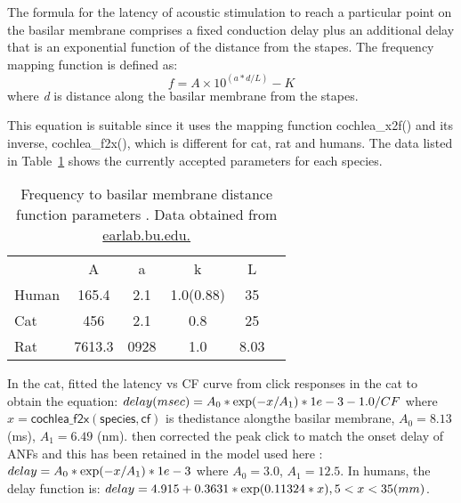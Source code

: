 The formula for the latency of acoustic stimulation to reach a particular point
on the basilar membrane comprises a fixed conduction delay plus an additional
delay that is an exponential function of the distance from the stapes. The
frequency mapping function is defined as:
\[
 f = A\times10^{\left(a*d/L\right)} - K
 \]
where \emph{d} is distance along the basilar membrane from the stapes.

\medskip{}

This equation is suitable since it uses the mapping function
\mbox{\textsf{cochlea\_x2f()}} and its inverse, \mbox{\textsf{cochlea\_f2x()}},
which is different for cat, rat and humans.  The data listed in
Table~\ref{tab:f2x} shows the currently accepted parameters for each species.


\begin{table}[h]
  \centering
  \begin{tabular}{lccccc}
    \hline
& A & a & k & L \\
Human &165.4	&2.1	&1.0(0.88)	&35     \\
Cat&456&	2.1&0.8&25 \\
Rat&7613.3	&0928	&1.0&	8.03     \\
    \hline
  \end{tabular}
  \caption{Frequency to basilar membrane distance function parameters \citep{FitzGeraldBurkittEtAl:2001}. Data obtained from \url{earlab.bu.edu.}}\label{tab:f2x}
\end{table}


In the cat, \citet{CarneyYin:1988} fitted the latency vs CF curve from click
responses in the cat to obtain the equation: \( delay (msec) = A_0 * {\rm exp}(
-x / A_1 ) * 1e-3 - 1.0/CF \) where $x = \mathsf{cochlea\_f2x(species, cf)}$ is
thedistance alongthe basilar membrane, $A_0 = 8.13$ (ms), $A_1 = 6.49$
(nm). \citet{HeinzZhangEtAl:2001} then corrected the peak click to match the
onset delay of ANFs and this has been retained in the model used here
\citep{ZilanyBruceEtAl:2009}: \(delay = A_0 * {\rm exp}(-x / A_1) * 1e-3 \)
where $A_0 = 3.0$, $A_1 = 12.5$. In humans, the delay function is: \( delay =
4.915 + 0.3631 * {\rm exp}(0.11324*x) , 5<x<35 (mm) \).

\medskip{}

